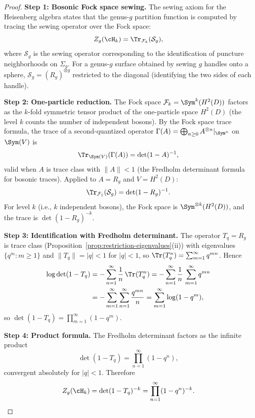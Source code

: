 \begin{proof}
\noindent\textbf{Step 1: Bosonic Fock space sewing.}
The sewing axiom for the Heisenberg algebra states that the
genus-$g$ partition function is computed by tracing the sewing
operator over the Fock space:
\[
Z_g(\cH_k)
= \Tr_{\mathcal{F}_k}(\mathcal{S}_g),
\]
where $\mathcal{S}_g$ is the sewing operator corresponding
to the identification of puncture neighborhoods on $\Sigma_g$.
For a genus-$g$ surface obtained by sewing $g$ handles onto a
sphere, $\mathcal{S}_g = (R_g)^{\otimes g}$ restricted to the
diagonal (identifying the two sides of each handle).

\medskip
\noindent\textbf{Step 2: One-particle reduction.}
The Fock space $\mathcal{F}_k = \Sym^k(H^2(D))$ factors as
the $k$-fold symmetric tensor product of the one-particle
space $H^2(D)$ (the level $k$ counts the number of independent
bosons). By the Fock space trace formula, the trace of a
second-quantized operator $\Gamma(A) = \bigoplus_{n \ge 0}
A^{\otimes n}|_{\Sym^n}$ on $\Sym(V)$ is
\[
\Tr_{\Sym(V)}(\Gamma(A)) = \det(1 - A)^{-1},
\]
valid when $A$ is trace class with $\|A\| < 1$ (the Fredholm
determinant formula for bosonic traces). Applied to
$A = R_g$ and $V = H^2(D)$:
\[
\Tr_{\mathcal{F}_1}(\mathcal{S}_g) = \det(1 - R_g)^{-1}.
\]
For level $k$ (i.e., $k$ independent bosons), the Fock space
is $\Sym^{\otimes k}(H^2(D))$, and the trace is
$\det(1 - R_g)^{-k}$.

\medskip
\noindent\textbf{Step 3: Identification with Fredholm determinant.}
The operator $T_q = R_g$ is trace class
(Proposition~\ref{prop:restriction-eigenvalues}(ii)) with
eigenvalues $\{q^m : m \ge 1\}$ and $\|T_q\| = |q| < 1$ for
$|q| < 1$, so $\Tr(T_q^n) = \sum_{m=1}^\infty q^{mn}$. Hence
\begin{align*}
\log\det(1 - T_q)
&= -\sum_{n=1}^\infty \frac{1}{n}\, \Tr(T_q^n)
= -\sum_{n=1}^\infty \frac{1}{n}\, \sum_{m=1}^\infty q^{mn} \\
&= -\sum_{m=1}^\infty \sum_{n=1}^\infty \frac{q^{mn}}{n}
= \sum_{m=1}^\infty \log(1 - q^m),
\end{align*}
so $\det(1 - T_q) = \prod_{m=1}^\infty (1 - q^m)$.

\medskip
\noindent\textbf{Step 4: Product formula.}
The Fredholm determinant factors as the infinite product
\[
\det(1 - T_q) = \prod_{n=1}^\infty (1 - q^n),
\]
convergent absolutely for $|q| < 1$. Therefore
\begin{equation}
Z_g(\cH_k) = \det(1 - T_q)^{-k}
= \prod_{n=1}^\infty (1 - q^n)^{-k}.
\end{equation}
\end{proof}

